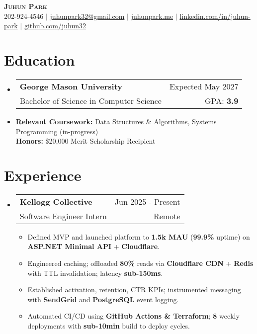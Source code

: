 \documentclass[letterpaper,11pt]{article}
\makeatletter
\newcommand{\resumeItem}[1]{
  \item{
    {#1}
  }
}
\newcommand{\resumeSubheading}[4]{
    \item
    \begin{tabular*}{0.985\textwidth}[t]{l@{\extracolsep{\fill}}r@{\hspace{-0.1in}}}
        {\textbf{#1}} & {#2} \\
        #3 &  #4 \\
    \end{tabular*}\vspace{-5pt}
}
\newcommand{\resumeSubHeadingListStart}{\begin{itemize}[leftmargin=0.00in, rightmargin=-0.2in, label={}]\vspace{3pt}}
\newcommand{\resumeSubHeadingListEnd}{\end{itemize}\vspace{-10pt}}
\newcommand{\resumeItemListStart}{\vspace{3pt}\begin{itemize}[leftmargin=0.15in, rightmargin=0.15in]}
\newcommand{\resumeItemListEnd}{\end{itemize}\vspace{-5pt}}
\makeatother
\begin{document}

\begin{center}
  \textbf{\Huge \scshape {Juhun Park}} \\ \vspace{3pt}
   202-924-4546 $|$
  \href{mailto:juhunpark32@gmail.com}{juhunpark32@gmail.com} $|$
  \href{https://www.juhunpark.me/}{juhunpark.me} $|$
  \href{https://linkedin.com/in/juhun-park}{linkedin.com/in/juhun-park} $|$
  \href{https://github.com/juhun32}{github.com/juhun32} \\
\end{center}

\vspace{-10pt}


\section{Education}
\resumeSubHeadingListStart
\resumeSubheading
{George Mason University}{Expected May 2027}
{Bachelor of Science in Computer Science}{GPA: \textbf{3.9}}
\resumeItem{\textbf{Relevant Coursework: } Data Structures \& Algorithms, Systems Programming (in-progress)} \\
{\textbf{Honors: } \$20,000 Merit Scholarship Recipient}
\resumeSubHeadingListEnd

\vspace{-8pt}


\section{Experience}

\resumeSubHeadingListStart
\resumeSubheading
{Kellogg Collective} {Jun 2025 - Present}
{Software Engineer Intern} {Remote}
\resumeItemListStart
\resumeItem{Defined MVP and launched platform to \textbf{1.5k MAU} (\textbf{99.9\%} uptime) on \textbf{ASP.NET Minimal API} + \textbf{Cloudflare}.}
\resumeItem{Engineered caching; offloaded \textbf{80\%} reads via \textbf{Cloudflare CDN} + \textbf{Redis} with TTL invalidation; latency \textbf{sub-150ms}.}
\resumeItem{Established activation, retention, CTR KPIs; instrumented messaging with \textbf{SendGrid} and \textbf{PostgreSQL} event logging.}
\resumeItem{Automated CI/CD using \textbf{GitHub Actions \& Terraform}; \textbf{8} weekly deployments with \textbf{sub-10min} build to deploy cycles.}
\resumeItemListEnd
\resumeSubHeadingListEnd
\end{document}

